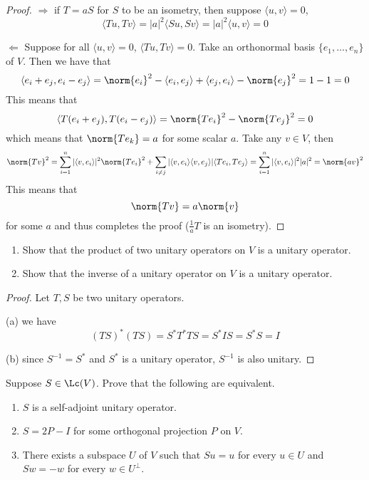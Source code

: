 \documentclass{extarticle}
\begin{document}
\begin{proof}
\(\Rightarrow\) if \(T = aS\) for \(S\) to be an isometry, then suppose \(\langle u,v \rangle = 0\),
\[\langle Tu,Tv\rangle = |a|^2 \langle Su,Sv \rangle = |a|^2 \langle u,v \rangle = 0\]

\(\Leftarrow\) Suppose for all \(\langle u,v \rangle = 0\), \(\langle Tu,Tv \rangle = 0\). Take
an orthonormal basis \(\{e_1, \ldots, e_n\}\) of \(V\). Then we have that
\[\langle e_i + e_j,e_i - e_j \rangle = \norm{e_i}^2 - \langle e_i,e_j \rangle +
\langle e_j,e_i \rangle - \norm{e_j}^2 = 1 - 1 = 0\]
This means that
\[\langle T(e_i + e_j), T(e_i - e_j) \rangle
= \norm{T e_i}^2 - \norm{T e_j}^2 = 0\]
which means that \(\norm{T e_k} = a\) for some scalar \(a\). Take any \(v \in V\), then
\[\norm{Tv}^2 = \sum_{i=1}^{n} |\langle v,e_i \rangle|^2 \norm{T e_i}^2 + \sum_{i \neq j}
|\langle v,e_i \rangle \langle v,e_j \rangle| \langle Te_i,Te_j \rangle
= \sum_{i=1}^{n} |\langle v,e_i \rangle|^2 |a|^2 = \norm{av}^2\]
This means that
\[\norm{Tv} = a \norm{v}\]
for some \(a\) and thus completes the proof (\(\frac{1}{a} T\) is an isometry).
\end{proof}

\begin{problem}{3}
    \begin{enumerate}[label=(\alph*)]
        \item Show that the product of two unitary operators on \(V\) is a unitary operator.
        \item Show that the inverse of a unitary operator on \(V\) is a unitary operator.
    \end{enumerate}
\end{problem}

\begin{proof}
Let \(T, S\) be two unitary operators.

(a) we have
\[(TS)^*(TS) = S^* T^* TS = S^*IS = S^*S = I\]

(b) since \(S^{-1} = S^*\) and \(S^*\) is a unitary operator, \(S^{-1}\) is also unitary.
\end{proof}

\begin{problem}{5}
    Suppose \(S \in \Lc(V)\). Prove that the following are equivalent.
    \begin{enumerate}[label=(\alph*)]
        \item \(S\) is a self-adjoint unitary operator.
        \item \(S = 2P - I\) for some orthogonal projection \(P\) on \(V\).
        \item There exists a subspace \(U\) of \(V\) such that \(Su = u\) for every
        \(u \in U\) and \(Sw = -w\) for every \(w \in U^\perp\).
    \end{enumerate}
\end{problem}
\end{document}
